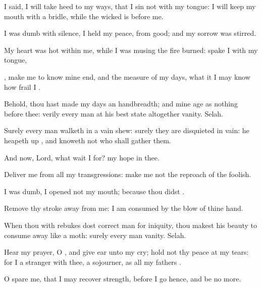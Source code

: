 {\Q {}I
said, I will take
heed to my
ways, that I
sin not with my
tongue: I will
keep my
mouth with a
bridle, while the
wicked is before me.


\par }{\Q {}I was
dumb with
silence, I held my
peace,
{} from
good; and my
sorrow was
stirred.


\par }{\Q {}My
heart was
hot
within me, while I was
musing the
fire
burned:
{}
spake I with my
tongue,


\par }{\Q {}, make me to
know mine
end, and the
measure of my
days, what it
{} I may
know how
frail I
{}.


\par }{\Q {}Behold, thou hast
made my
days
{} an
handbreadth; and mine
age
{} as nothing before thee: verily
every
man at his best
state
{}
altogether
vanity.
Selah.


\par }{\Q {}Surely every
man
walketh in a vain
shew: surely they are
disquieted in
vain: he heapeth
up
{}, and
knoweth not who shall
gather them.


\par }{\BB \par }
{\Q {}And now,
Lord, what
wait I for? my
hope
{} in thee.


\par }{\Q {}Deliver me from all my
transgressions:
make me not the
reproach of the
foolish.


\par }{\Q {}I was
dumb, I
opened not my
mouth; because thou
didst
{}.


\par }{\Q {}Remove thy
stroke
away from me: I am
consumed by the
blow of thine
hand.


\par }{\Q {}When thou with
rebukes dost
correct
man for
iniquity, thou makest his
beauty to consume
away like a
moth: surely every
man
{}
vanity.
Selah.


\par }{\Q {}Hear my
prayer, O
{}, and give
ear unto my
cry; hold not thy
peace at my
tears: for I
{} a
stranger with thee,
{} a
sojourner, as all my
fathers
{}.


\par }{\Q {}O
spare me, that I may recover
strength, before I go
hence, and be no more.




\par }

